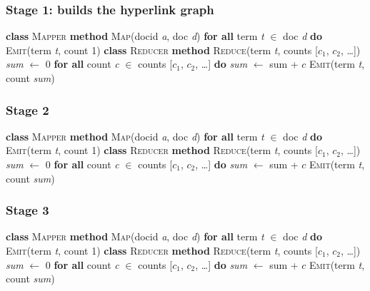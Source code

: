 \documentclass[11pt,a4paper]{article}
\begin{document}
\subsubsection*{Stage 1: builds the hyperlink graph}
\begin{algorithm}[H]
\textbf{class} \textsc{Mapper}\;
\Indp\textbf{method} \textsc{Map}(docid \textit{a}, doc \textit{d})\;
\Indp\textbf{for all} term \textit{t} $\in$ doc \textit{d} \textbf{do}\;
\Indm\textsc{Emit}(term \textit{t}, count 1)\;
\;
\Indm\textbf{class} \textsc{Reducer}\;
\Indp\textbf{method} \textsc{Reduce}(term \textit{t}, counts [$c_1$, $c_2$, \dots])\;
\Indp\textit{sum} $\leftarrow$ $0$\;
\textbf{for all} count \textit{c} $\in$ counts [$c_1$, $c_2$, \dots] \textbf{do}\;
\Indp\textit{sum} $\leftarrow$ sum + $c$\;
\Indm\textsc{Emit}(term \textit{t}, count \textit{sum})
\end{algorithm}
\subsubsection*{Stage 2}
\begin{algorithm}[H]
\textbf{class} \textsc{Mapper}\;
\Indp\textbf{method} \textsc{Map}(docid \textit{a}, doc \textit{d})\;
\Indp\textbf{for all} term \textit{t} $\in$ doc \textit{d} \textbf{do}\;
\Indm\textsc{Emit}(term \textit{t}, count 1)\;
\;
\Indm\textbf{class} \textsc{Reducer}\;
\Indp\textbf{method} \textsc{Reduce}(term \textit{t}, counts [$c_1$, $c_2$, \dots])\;
\Indp\textit{sum} $\leftarrow$ $0$\;
\textbf{for all} count \textit{c} $\in$ counts [$c_1$, $c_2$, \dots] \textbf{do}\;
\Indp\textit{sum} $\leftarrow$ sum + $c$\;
\Indm\textsc{Emit}(term \textit{t}, count \textit{sum})
\end{algorithm}
\subsubsection*{Stage 3}
\begin{algorithm}[H]
\textbf{class} \textsc{Mapper}\;
\Indp\textbf{method} \textsc{Map}(docid \textit{a}, doc \textit{d})\;
\Indp\textbf{for all} term \textit{t} $\in$ doc \textit{d} \textbf{do}\;
\Indm\textsc{Emit}(term \textit{t}, count 1)\;
\;
\Indm\textbf{class} \textsc{Reducer}\;
\Indp\textbf{method} \textsc{Reduce}(term \textit{t}, counts [$c_1$, $c_2$, \dots])\;
\Indp\textit{sum} $\leftarrow$ $0$\;
\textbf{for all} count \textit{c} $\in$ counts [$c_1$, $c_2$, \dots] \textbf{do}\;
\Indp\textit{sum} $\leftarrow$ sum + $c$\;
\Indm\textsc{Emit}(term \textit{t}, count \textit{sum})
\end{algorithm}
\end{document}
